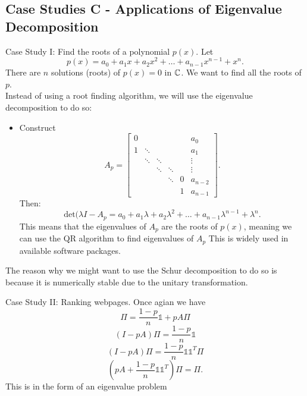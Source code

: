 \documentclass[../main/main.tex]{subfiles}
\begin{document}
	\subsection{Case Studies C - Applications of Eigenvalue Decomposition}
	Case Study I: Find the roots of a polynomial $p(x)$. Let  \[
		p(x)=a_0+a_1x+a_2x^2+\ldots+a_{n-1}x^{n-1}+x^{n}
	.\] There are $n$ solutions (roots) of $p(x)=0$ in $\mathbb{C}$. We want to find all the roots of $p$.\\

	Instead of using a root finding algorithm, we will use the eigenvalue decomposition to do so: 
	\begin{itemize}
		\item Construct \[
				 A_p = \begin{bmatrix} 0&&&&&a_0 \\ 1&\ddots &&&&a_1\\ &\ddots&\ddots&&&\vdots\\&&\ddots&\ddots&&\vdots \\ &&&\ddots&0&a_{n-2}\\&&&&1&a_{n-1} \end{bmatrix} 
			 .\] Then: \[
			 \text{det}(\lambda I - A_p= a_0+a_1\lambda+a_2\lambda^2+\ldots+a_{n-1}\lambda^{n-1}+\lambda^{n}
		 .\] This means that the eigenvalues of $A_p$ are the roots of $p(x)$, meaning we can use the QR algorithm to find eigenvalues of $A_p$ This is widely used in available software packages.
	\end{itemize}
	\begin{remark}
		The reason why we might want to use the Schur decomposition to do so is because it is numerically stable due to the unitary transformation.
	\end{remark}
	Case Study II: Ranking webpages. Once agian we have \[
		\Pi = \frac{1-p}{n}\mathds{1} + pA\Pi
	\]\[
	(I-pA)\Pi = \frac{1-p}{n}\mathds{1}
	\]\[
	(I-pA)\Pi=\frac{1-p}{n}\mathds{1}\mathds{1}^{T}\Pi
	\]\[
	(pA+\frac{1-p}{n}\mathds{1} \mathds{1}^{T})\Pi=\Pi
	.\]    This is in the form of an eigenvalue problem
\end{document}
